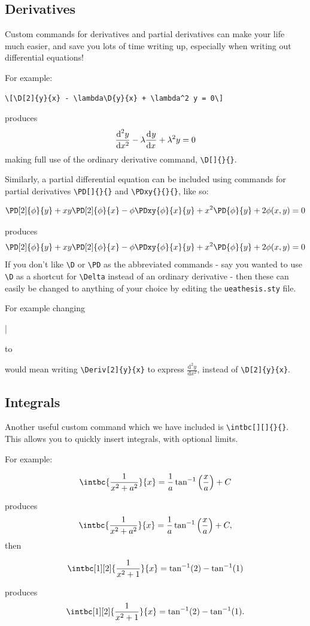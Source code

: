 \subsection{Derivatives}
Custom commands for derivatives and partial derivatives can make your life much easier, and save you lots of time writing up, especially when writing out differential equations!

For example:
\begin{verbatim}
\[\D[2]{y}{x} - \lambda\D{y}{x} + \lambda^2 y = 0\]
\end{verbatim}
produces
\[\D[2]{y}{x} - \lambda\D{y}{x} + \lambda^2 y = 0\]
making full use of the ordinary derivative command, \verb|\D[]{}{}|. 

Similarly, a partial differential equation can be included using commands for partial derivatives \verb|\PD[]{}{}| and \verb|\PDxy{}{}{}|, like so:
\begin{spverbatim}
\[\PD[2]{\phi}{y} + xy \PD[2]{\phi}{x} - \phi \PDxy{\phi}{x}{y} + x^2\PD{\phi}{y} + 2\phi(x,y) = 0\]
\end{spverbatim}
produces
\[\PD[2]{\phi}{y} + xy \PD[2]{\phi}{x} - \phi \PDxy{\phi}{x}{y} + x^2\PD{\phi}{y} + 2\phi(x,y) = 0\]
If you don't like \verb|\D| or \verb|\PD| as the abbreviated commands - say you wanted to use \verb|\D| as a shortcut for \verb|\Delta| instead of an ordinary derivative - then these can easily be changed to anything of your choice by editing the \verb|ueathesis.sty| file.

For example changing 
\begin{spverbatim}
\newcommand{\D}[3][]{\frac{\text{d}^{#1} #2}{\text{d} #3^{#1}}}| 
\end{spverbatim}
to
\begin{spverbatim}
\newcommand{\Deriv}[3][]{\frac{\text{d}^{#1} #2}{\text{d} #3^{#1}}}
\end{spverbatim}
would mean writing \verb|\Deriv[2]{y}{x}| to express $\frac{\text{d}^2 y}{\text{d} x^2}$, instead of \verb|\D[2]{y}{x}|.
\subsection{Integrals}
Another useful custom command which we have included is \verb|\intbc[][]{}{}|. This allows you to quickly insert integrals, with optional limits.

For example:
\begin{spverbatim}
\[\intbc{\frac{1}{x^2+a^2}}{x} = \frac{1}{a}\tan^{-1}\left(\frac{x}{a}\right)+C\]
\end{spverbatim}
produces
\[\intbc{\frac{1}{x^2+a^2}}{x} = \frac{1}{a}\tan^{-1}\left(\frac{x}{a}\right)+C,\] 
then
\begin{spverbatim}
\[\intbc[1][2]{\frac{1}{x^2+1}}{x} = \tan^{-1}(2)-\tan^{-1}(1)\]
\end{spverbatim}
produces
\[\intbc[1][2]{\frac{1}{x^2+1}}{x} = \tan^{-1}(2)-\tan^{-1}(1).\]

